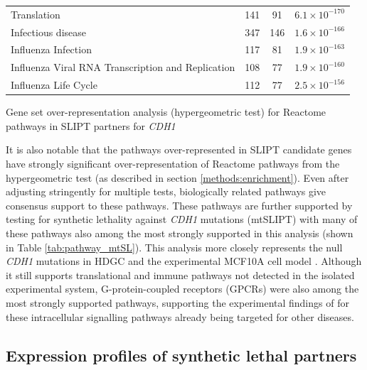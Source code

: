 \begin{table}[!ht]
{\begin{threeparttable}
\begin{tabular}{lccc}
  \rowcolor{black!5}
  Translation & 141 &  91 & $6.1 \times 10^{-170}$ \\ 
  \rowcolor{black!10}
  Infectious disease & 347 & 146 & $1.6 \times 10^{-166}$ \\ 
  \rowcolor{black!5}
  Influenza Infection & 117 &  81 & $1.9 \times 10^{-163}$ \\ 
  \rowcolor{black!10}
  Influenza Viral RNA Transcription and Replication & 108 &  77 & $1.9 \times 10^{-160}$ \\ 
  \rowcolor{black!5}
  Influenza Life Cycle & 112 &  77 & $2.5 \times 10^{-156}$ \\ 
   \hline
\end{tabular}
\begin{tablenotes}
\raggedright \small
Gene set over-representation analysis (hypergeometric test) for Reactome pathways in SLIPT partners for \textit{CDH1}
\end{tablenotes}
\end{threeparttable}
}
\end{table}

It is also notable that the pathways over-represented in SLIPT candidate genes have strongly significant over-representation of Reactome pathways from the hypergeometric test (as described in section \ref{methods:enrichment}). Even after adjusting stringently for multiple tests, biologically related pathways give consensus support to these pathways. These pathways are further supported by testing for synthetic lethality against \textit{CDH1} mutations (mtSLIPT) with many of these pathways also among the most strongly supported in this analysis (shown in Table \ref{tab:pathway_mtSL}). This analysis more closely represents the null \textit{CDH1} mutations in HDGC \citep{Guilford1998} and the experimental MCF10A cell model \citep{Chen2014}. Although it still supports translational and immune pathways not detected in the isolated experimental system, G-protein-coupled receptors (GPCRs) were also among the most strongly supported pathways, supporting the experimental findings of \citet{Telford2015} for these intracellular signalling pathways already being targeted for other diseases. 


\FloatBarrier


\subsection{Expression profiles of synthetic lethal partners} \label{chapt3:exprSL_clusters}

